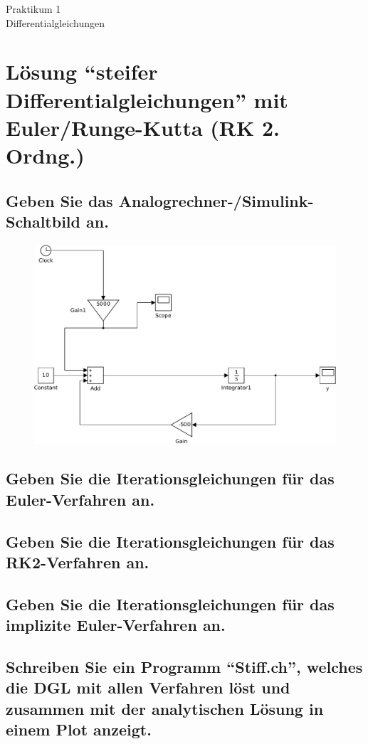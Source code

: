 \documentclass[10pt,a4paper]{article}
\begin{document}
\begin{center}
\begin{LARGE}
Praktikum 1\\
Differentialgleichungen
\end{LARGE}
\end{center}

\section{Lösung  "`steifer Differentialgleichungen"' mit Euler/Runge-Kutta (RK 2. Ordng.)}

\subsection{Geben Sie das Analogrechner-/Simulink-Schaltbild an.}
\begin{figure}[h]
\centering
\includegraphics[width=0.9\linewidth]{../screenshots/1}
\end{figure}
\subsection{Geben Sie die Iterationsgleichungen für das Euler-Verfahren an.}
\subsection{Geben Sie die Iterationsgleichungen für das RK2-Verfahren an.}
\subsection{Geben Sie die Iterationsgleichungen für das implizite Euler-Verfahren an.}
\subsection{Schreiben Sie ein Programm "`Stiff.ch"', welches die DGL mit allen Verfahren
löst und zusammen mit der analytischen Lösung in einem Plot anzeigt.}
\end{document}
